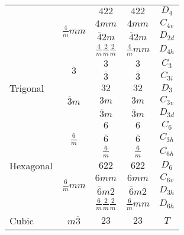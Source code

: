 \begin{table}[h]
\begin{tabular}{lcccc}
                               \cline{2-5}
							  & \multirow{4}{*}{$\displaystyle \frac{4}{m}mm$} & $422$ & $422$ & $D_4$\\
                               &                                 & $4mm$ & $4mm$ & $C_{4v}$ \\
                               &                                 & $\overline{4}2m$ & $\overline{4}2m$ & $D_{2d}$ \\ 
                               &                                 & $\displaystyle \frac{4}{m}\frac{2}{m}\frac{2}{m}$ & $\displaystyle \frac{4}{m}mm$ & $D_{4h}$ \\ [1.5ex]
    \hline
    \multirow{5}{*}{Trigonal } & \multirow{2}{*}{$\overline{3}$} & $3$ & $3$ & $C_3$\\
                               &                                 & $\overline{3}$ & $\overline{3}$ & $C_{3i}$ \\
                               \cline{2-5}
							  & \multirow{3}{*}{$\overline{3}m$} & $32$ & $32$ & $D_3$\\
                               &                                 & $3m$ & $3m$ & $C_{3v}$ \\
                               &                                 & $\overline{3}m$ & $\overline{3}m$ & $D_{3d}$ \\ 
    \hline
    \multirow{7}{*}{Hexagonal} & \multirow{3}{*}{$\displaystyle \frac{6}{m}$} & $6$ & $6$ & $C_6$\\
                               &                                 & $\overline{6}$ & $\overline{6}$ & $C_{3h}$ \\
                               &                                 & $\displaystyle \frac{6}{m}$ & $\displaystyle \frac{6}{m}$ & $C_{6h}$ \\[1.5ex]
                               \cline{2-5}
							  & \multirow{4}{*}{$\displaystyle \frac{6}{m}mm$} & $622$ & $622$ & $D_6$\\
                               &                                 & $6mm$ & $6mm$ & $C_{6v}$ \\
                               &                                 & $\overline{6}m2$ & $\overline{6}m2$ & $D_{3h}$ \\ 
                               &                                 & $\displaystyle \frac{6}{m}\frac{2}{m}\frac{2}{m}$ & $\displaystyle \frac{6}{m}mm$ & $D_{6h}$ \\  [1.5ex]
    \hline
    \multirow{5}{*}{Cubic}    & \multirow{2}{*}{$m\overline{3}$} & $23$ & $23$ & $T$\\

\end{tabular}
\end{table}
